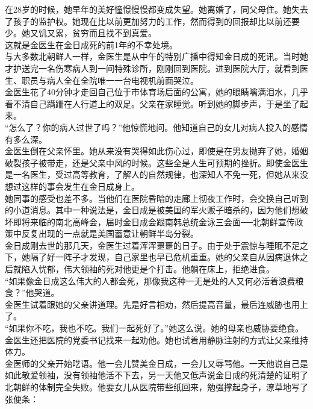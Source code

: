 在28岁的时候，她早年的美好憧憬慢慢都变成失望。她离婚了，同父母住。她失去了孩子的监护权。她现在比以前更加努力的工作，然而得到的回报却比以前还要少。她又饥又累，贫穷而且找不到真爱。\\

这就是金医生在金日成死的前1年的不幸处境。\\

与大多数北朝鲜人一样，金医生是从中午的特别广播中得知金日成的死讯。当时她才护送完一名伤寒病人到一间特殊诊所，刚刚回到医院。进到医院大厅，就看到医生、职员与病人全在全院唯一一台电视机前面哭泣。\\

金医生花了40分钟才走回自己位于市体育场后面的公寓，她的眼睛噙满泪水，几乎看不清自己蹒跚在人行道上的双足。父亲在家睡觉。听到她的脚步声，于是坐了起来。\\

“怎么了？你的病人过世了吗？”他惊慌地问。他知道自己的女儿对病人投入的感情有多么深。\\

金医生倒在父亲怀里。她从来没有哭得如此伤心过，即使是在男友抛弃了她，婚姻破裂孩子被带走，还是父亲中风的时候。这些全是人生可预期的挫折。即使金医生是一名医生，受过高等教育，了解人的自然规律，也深知人不免一死，但她从来没想过这样的事会发生在金日成身上。\\

她同事的感受也差不多。当他们在医院昏暗的走廊上彻夜工作时，会交换自己听到的小道消息。其中一种说法是，金日成是被美国的军火贩子暗杀的，因为他们想破坏即将来临的南北高峰会，届时金日成会跟南韩总统金泳三会面──北朝鲜宣传政策中反复出现的一点就是美国蓄意让朝鲜半岛分裂。\\

金日成刚去世的那几天，金医生过着浑浑噩噩的日子。由于处于震惊与睡眠不足之下，她隔了好一阵子才发现，自己家里也早已危机重重。她的父亲自从因病退休之后就陷入忧郁，伟大领袖的死对他更是个打击。他躺在床上，拒绝进食。\\

“如果像金日成这么伟大的人都会死，那像我这种一无是处的人又何必活着浪费粮食？”他哭道。\\

金医生试着跟她的父亲讲道理。先是好言相劝，然后提高音量，最后连威胁也用上了。\\

“如果你不吃，我也不吃。我们一起死好了。”她这么说。她的母亲也威胁要绝食。金医生还把医院的党委书记找来一起劝他。她也试着用静脉注射的方式让父亲维持体力。\\

金医师的父亲开始呓语。他一会儿赞美金日成，一会儿又辱骂他。一天他说自己是如此敬爱领袖，没有领袖他活不下去，另一天他又低声说金日成的死清楚的证明了北朝鲜的体制完全失败。他要女儿从医院带些纸回来，勉强撑起身子，潦草地写了张便条：\\

